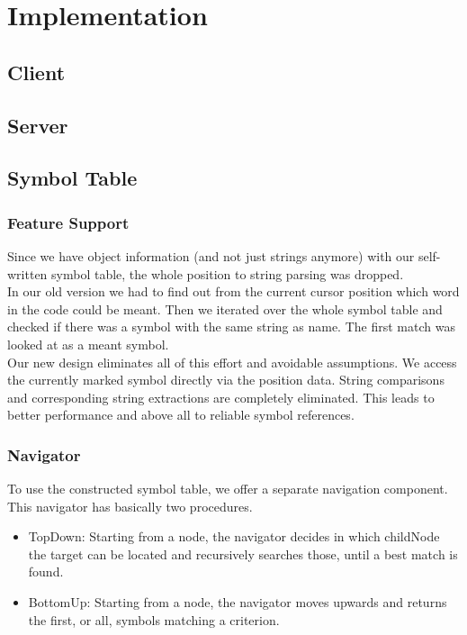 \section{Implementation}

\subsection{Client}




\subsection{Server}




\subsection{Symbol Table}



\subsubsection{Feature Support}
Since we have object information (and not just strings anymore) with our self-written symbol table,
the whole position to string parsing was dropped. \\

In our old version we had to find out from the current cursor position which word in the code could be meant.
Then we iterated over the whole symbol table and checked if there was a symbol with the same string as name.
The first match was looked at as a meant symbol. \\

Our new design eliminates all of this effort and avoidable assumptions.
We access the currently marked symbol directly via the position data.
String comparisons and corresponding string extractions are completely eliminated.
This leads to better performance and above all to reliable symbol references.


\subsubsection{Navigator}
To use the constructed symbol table, we offer a separate navigation component.
This navigator has basically two procedures.
\begin{itemize}
\item TopDown: Starting from a node, the navigator decides in which childNode the target can be located and recursively searches those, until a best match is found.
\item BottomUp: Starting from a node, the navigator moves upwards and returns the first, or all, symbols matching a criterion.
\end{itemize}

